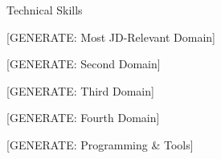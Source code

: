 \documentclass{resume}
\begin{document}
\begin{rSection}{Technical Skills}

\begin{skillgroup}{[GENERATE: Most JD-Relevant Domain]}
\skilldash{[GENERATE]}
\skilldash{[GENERATE]}
\end{skillgroup}

\begin{skillgroup}{[GENERATE: Second Domain]}
\skilldash{[GENERATE]}
\skilldash{[GENERATE]}
\end{skillgroup}

\begin{skillgroup}{[GENERATE: Third Domain]}
\skilldash{[GENERATE]}
\end{skillgroup}

\begin{skillgroup}{[GENERATE: Fourth Domain]}
\skilldash{[GENERATE]}
\end{skillgroup}

\begin{skillgroup}{[GENERATE: Programming \& Tools]}
\skilldash{[GENERATE]}
\end{skillgroup}

\end{rSection}
\vspace{-0.15cm}
\end{document}

